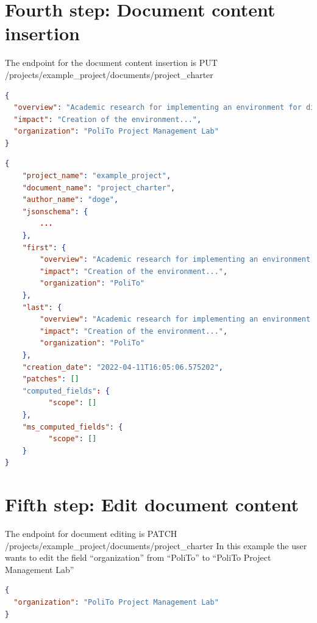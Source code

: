 \documentclass[12pt]{report}
\begin{document}
\section{Fourth step: Document content insertion}

The endpoint for the document content insertion is\newline
PUT /projects/example\_project/documents/project\_charter

\begin{lstlisting}[language=json, caption=Document content insertion]
{
  "overview": "Academic research for implementing an environment for digital delivery of projects",
  "impact": "Creation of the environment...",
  "organization": "PoliTo Project Management Lab"
}
\end{lstlisting}

\begin{lstlisting}[language=json, caption=Document response]
{
    "project_name": "example_project",
    "document_name": "project_charter",
    "author_name": "doge",
    "jsonschema": {
        ...
    },
    "first": {
        "overview": "Academic research for implementing an environment for digital delivery of projects",
        "impact": "Creation of the environment...",
        "organization": "PoliTo"
    },
    "last": {
        "overview": "Academic research for implementing an environment for digital delivery of projects",
        "impact": "Creation of the environment...",
        "organization": "PoliTo"
    },
    "creation_date": "2022-04-11T16:05:06.575202",
    "patches": []
    "computed_fields": {
          "scope": []
    },
    "ms_computed_fields": {
          "scope": []
    }
}
\end{lstlisting}

\section{Fifth step: Edit document content}

The endpoint for document editing is\newline
PATCH /projects/example\_project/documents/project\_charter\newline
In this example the user wants to edit the field “organization” from “PoliTo” to “PoliTo Project Management Lab”

\begin{lstlisting}[language=json, caption=document patch request body]
{
  "organization": "PoliTo Project Management Lab"
}
\end{lstlisting}
\end{document}
